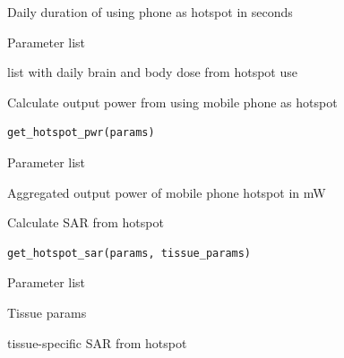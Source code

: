 \documentclass[a4paper]{book}
\begin{document}
%
\begin{Arguments}
\begin{ldescription}
\item[\code{duration\_hotspot}] Daily duration of using phone as hotspot in seconds

\item[\code{params}] Parameter list
\end{ldescription}
\end{Arguments}
%
\begin{Value}
list with daily brain and body dose from hotspot use
\end{Value}
%
\begin{Description}
Calculate output power from using mobile phone as hotspot
\end{Description}
%
\begin{Usage}
\begin{verbatim}
get_hotspot_pwr(params)
\end{verbatim}
\end{Usage}
%
\begin{Arguments}
\begin{ldescription}
\item[\code{params}] Parameter list
\end{ldescription}
\end{Arguments}
%
\begin{Value}
Aggregated output power of mobile phone hotspot in mW
\end{Value}
%
\begin{Description}
Calculate SAR from hotspot
\end{Description}
%
\begin{Usage}
\begin{verbatim}
get_hotspot_sar(params, tissue_params)
\end{verbatim}
\end{Usage}
%
\begin{Arguments}
\begin{ldescription}
\item[\code{params}] Parameter list

\item[\code{tissue\_params}] Tissue params
\end{ldescription}
\end{Arguments}
%
\begin{Value}
tissue-specific SAR from hotspot
\end{Value}
\end{document}
